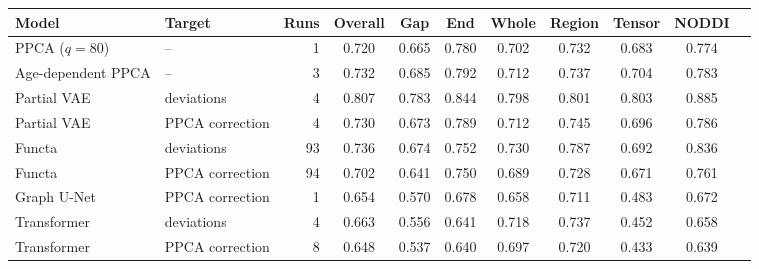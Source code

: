 \begin{tabular}{llrcccccccc}
\toprule
Model & Target & Runs & Overall & Gap & End & Whole & Region & Tensor & NODDI \\
\midrule
PPCA ($q=80$) & -- & 1 & 0.720 & 0.665 & 0.780 & 0.702 & 0.732 & 0.683 & 0.774 \\
Age-dependent PPCA & -- & 3 & 0.732 & 0.685 & 0.792 & 0.712 & 0.737 & 0.704 & 0.783 \\
Partial VAE & deviations & 4 & 0.807 & 0.783 & 0.844 & 0.798 & 0.801 & 0.803 & 0.885 \\
Partial VAE & PPCA correction & 4 & 0.730 & 0.673 & 0.789 & 0.712 & 0.745 & 0.696 & 0.786 \\
Functa & deviations & 93 & 0.736 & 0.674 & 0.752 & 0.730 & 0.787 & 0.692 & 0.836 \\
Functa & PPCA correction & 94 & 0.702 & 0.641 & 0.750 & 0.689 & 0.728 & 0.671 & 0.761 \\
Graph U-Net & PPCA correction & 1 & 0.654 & 0.570 & 0.678 & 0.658 & 0.711 & 0.483 & 0.672 \\
Transformer & deviations & 4 & 0.663 & 0.556 & 0.641 & 0.718 & 0.737 & 0.452 & 0.658 \\
Transformer & PPCA correction & 8 & 0.648 & 0.537 & 0.640 & 0.697 & 0.720 & 0.433 & 0.639 \\
\bottomrule
\end{tabular}
